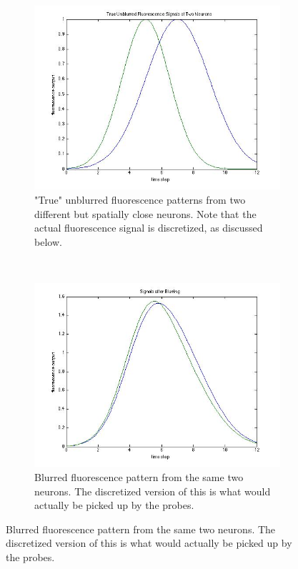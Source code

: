 \documentclass[11pt]{article}
\begin{document}
\begin{figure}[H]
        \centering
        \begin{subfigure}[b]{0.5\textwidth}
                \includegraphics[width=\textwidth]{two_unblurred_neurons.jpg}
                \caption{"True" unblurred fluorescence patterns from two different but spatially close neurons. Note that the actual fluorescence signal is discretized, as discussed below.}
                \label{fig:unblurred}
        \end{subfigure}%
        ~ %
        \begin{subfigure}[b]{0.5\textwidth}
                \includegraphics[width=\textwidth]{blurred_fluorescence.jpg}
                \caption{Blurred fluorescence pattern from the same two neurons. The discretized version of this is what would actually be picked up by the probes.}
                \label{fig:tiger}
        \end{subfigure}
      \end{figure}
   
\end{document}
